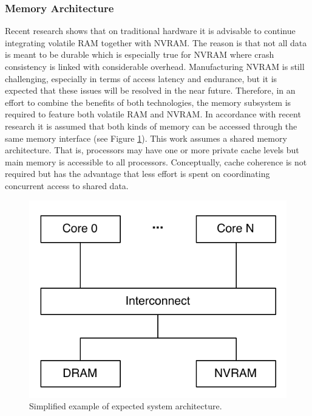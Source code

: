 \subsubsection{Memory Architecture}

Recent research shows that on traditional hardware it is advisable to continue
integrating volatile \ac{RAM} together with \ac{NVRAM}. The reason is that not
all data is meant to be durable which is especially true for \ac{NVRAM} where
crash consistency is linked with considerable overhead. Manufacturing \ac{NVRAM}
is still challenging, especially in terms of access latency and endurance, but
it is expected that these issues will be resolved in the near future. Therefore,
in an effort to combine the benefits of both technologies, the memory subsystem
is required to feature both volatile \ac{RAM} and \ac{NVRAM}. In accordance with
recent research it is assumed that both kinds of memory can be accessed through
the same memory interface (see Figure \ref{fig:concept-sys-mem}). This work assumes a shared memory architecture. That is, processors may have one
or more private cache levels but main memory is accessible to all processors.
Conceptually, cache coherence is not required but has the advantage that less
effort is spent on coordinating concurrent access to shared data.

\begin{figure}[!ht]
    \centering
    \includegraphics[scale=0.8]{figures/concept/sys-mem.pdf}
    \caption{Simplified example of expected system architecture.}
    \label{fig:concept-sys-mem}
\end{figure}

